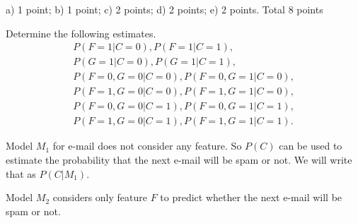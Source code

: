 \documentclass[a4paper]{article}
\newcommand{\tjboxed}[1]{}
\begin{document}
\begin{exam}
\begin{vraag}{a) 1 point; b) 1 point; c) 2 points; d) 2 points; e) 2 points. Total 8 points}
\begin{deelvraag}
Determine the following estimates.
\begin{gather*}
  P(F=1|C=0), P(F=1|C=1), \\ P(G=1|C=0), P(G=1|C=1), \\
  P(F=0,G=0|C=0), P(F=0,G=1|C=0), \\ P(F=1,G=0|C=0), P(F=1,G=1|C=0), \\
  P(F=0,G=0|C=1), P(F=0,G=1|C=1), \\ P(F=1,G=0|C=1), P(F=1,G=1|C=1).
\end{gather*}
\tjboxed{%
 \begin{alignat*}{3}
     P(F=1|C=0)&=\frac{6}{17}=0.3529   &\qquad     P(F=1|C=1)&=\frac{143}{196}=0.7296 \\
     P(G=1|C=0)&=\frac{28}{51}=0.5490  &\qquad     P(G=1|C=1)&=\frac{93}{196}=0.4745 \\ 
 P(F=0,G=0|C=0)&=\frac{5}{17}=0.2941   &\qquad P(F=0,G=1|C=0)&=\frac{6}{17}=0.3529 \\
 P(F=1,G=0|C=0)&=\frac{8}{51}=0.1569   &\qquad P(F=1,G=1|C=0)&=\frac{10}{51}=0.1961 \\
 P(F=0,G=0|C=1)&=\frac{1}{7}=0.1429    &\qquad P(F=0,G=1|C=1)&=\frac{25}{196}=0.1276 \\
 P(F=1,G=0|C=1)&=\frac{75}{196}=0.3827 &\qquad P(F=1,G=1|C=1)&=\frac{17}{49}=0.3469 
 \end{alignat*}
}
\end{deelvraag}
%
Model $M_1$ for e-mail does not consider any feature. So $P(C)$ can be used to estimate the probability that the next e-mail will be spam or not. We will write that as $P(C|M_1)$.\\
\begin{deelvraag}
  Model $M_2$ considers only feature $F$ to predict whether the next e-mail will be spam or not.
  

\end{deelvraag}
\end{vraag}
\end{exam}
\end{document}
